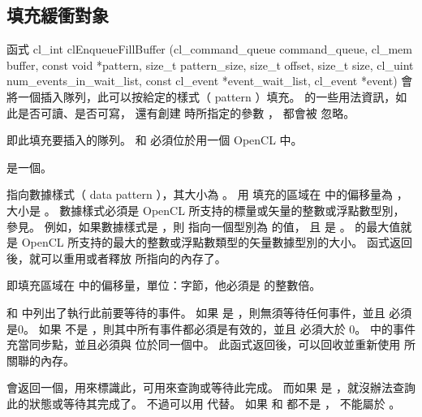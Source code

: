 \subsection{填充緩衝對象}

函式
\startclc
cl_int clEnqueueFillBuffer (cl_command_queue command_queue,
			cl_mem buffer,
			const void *pattern,
			size_t pattern_size,
			size_t offset,
			size_t size,
			cl_uint num_events_in_wait_list,
			const cl_event *event_wait_list,
			cl_event *event)
\stopclc
會將一個插入隊列，此可以按給定的樣式（ pattern ）填充。
 的一些用法資訊，如此是否可讀、是否可寫，
還有創建  時所指定的參數 ，
都會被  忽略。

 即此填充要插入的隊列。
 和  必須位於用一個 OpenCL 中。

 是一個。

 指向數據樣式（ data pattern ），其大小為 。
用  填充的區域在  中的偏移量為 ，大小是 。
數據樣式必須是 OpenCL 所支持的標量或矢量的整數或浮點數型別，參見。
例如，如果數據樣式是 ，則  指向一個型別為  的值，
且  是 。
 的最大值就是 OpenCL 所支持的最大的整數或浮點數類型的矢量數據型別的大小。
函式返回後，就可以重用或者釋放  所指向的內存了。

 即填充區域在  中的偏移量，單位：字節，他必須是  的整數倍。

 和  中列出了執行此前要等待的事件。
如果  是 ，則無須等待任何事件，並且  必須是0。
如果  不是 ，則其中所有事件都必須是有效的，並且  必須大於 0。
 中的事件充當同步點，並且必須與  位於同一個中。
此函式返回後，可以回收並重新使用  所關聯的內存。

 會返回一個，用來標識此，可用來查詢或等待此完成。
而如果  是 ，就沒辦法查詢此的狀態或等待其完成了。
不過可以用  代替。
如果  和  都不是 ，  不能屬於 。

